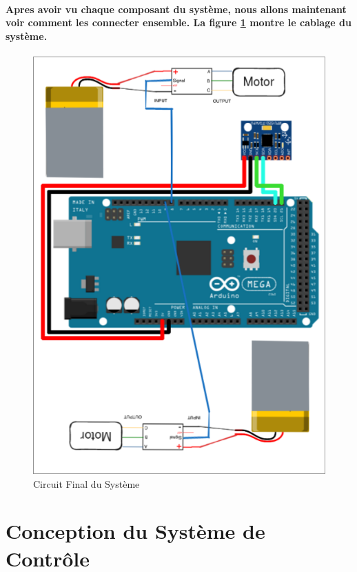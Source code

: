 \paragraph{Apres avoir vu chaque composant du système, nous allons maintenant voir comment les connecter ensemble. La figure \ref{fig:circuit-final} montre le cablage du système.}
\paragraph*{}
\begin{figure}[!htpb]
	\centering
	\includegraphics[width=0.9\linewidth]{Figures/final-circuit.png}
	\caption{Circuit Final du Système}
	\label{fig:circuit-final}
\end{figure}

\newpage

\section{Conception du Système de Contrôle}

